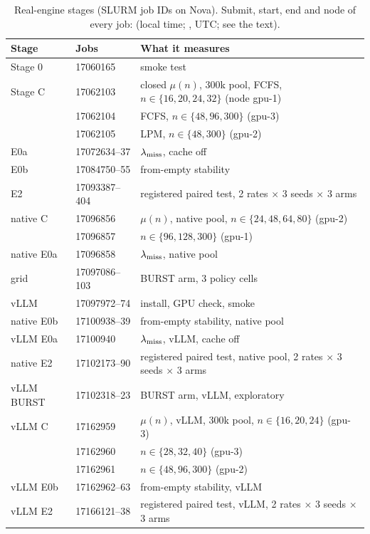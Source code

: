 \begin{table}[htbp]
\centering\footnotesize\renewcommand{\arraystretch}{0.9}
\caption{Real-engine stages (SLURM job IDs on Nova). Submit, start, end and node of every job:  (local time; , UTC; see the text).}\label{tab:stages}
\begin{tabular}{@{}l l p{3.6cm}@{}}
\toprule
Stage & Jobs & What it measures\\
\midrule
Stage 0 & 17060165 & smoke test\\
Stage C & 17062103 & closed $\mu(n)$, 300k pool, FCFS, $n\in\{16,20,24,32\}$ (node gpu-1)\\
 & 17062104 & FCFS, $n\in\{48,96,300\}$ (gpu-3)\\
 & 17062105 & LPM, $n\in\{48,300\}$ (gpu-2)\\
E0a & 17072634--37 & $\lambda_{\mathrm{miss}}$, cache off\\
E0b & 17084750--55 & from-empty stability\\
E2 & 17093387--404 & registered paired test, 2 rates $\times$ 3 seeds $\times$ 3 arms\\
native C & 17096856 & $\mu(n)$, native pool, $n\in\{24,48,64,80\}$ (gpu-2)\\
 & 17096857 & $n\in\{96,128,300\}$ (gpu-1)\\
native E0a & 17096858 & $\lambda_{\mathrm{miss}}$, native pool\\
grid & 17097086--103 & BURST arm, 3 policy cells\\
vLLM & 17097972--74 & install, GPU check, smoke\\
native E0b & 17100938--39 & from-empty stability, native pool\\
vLLM E0a & 17100940 & $\lambda_{\mathrm{miss}}$, vLLM, cache off\\
native E2 & 17102173--90 & registered paired test, native pool, 2 rates $\times$ 3 seeds $\times$ 3 arms\\
vLLM BURST & 17102318--23 & BURST arm, vLLM, exploratory\\
vLLM C & 17162959 & $\mu(n)$, vLLM, 300k pool, $n\in\{16,20,24\}$ (gpu-3)\\
 & 17162960 & $n\in\{28,32,40\}$ (gpu-3)\\
 & 17162961 & $n\in\{48,96,300\}$ (gpu-2)\\
vLLM E0b & 17162962--63 & from-empty stability, vLLM\\
vLLM E2 & 17166121--38 & registered paired test, vLLM, 2 rates $\times$ 3 seeds $\times$ 3 arms\\

\end{tabular}
\end{table}
